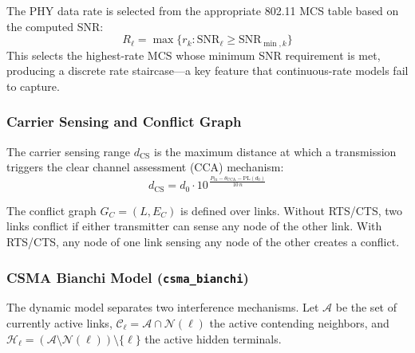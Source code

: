 \documentclass[conference]{IEEEtran}
\begin{document}
The PHY data rate is selected from the appropriate 802.11 MCS table based
on the computed SNR:
\begin{equation}
R_\ell = \max\{r_k : \text{SNR}_\ell \geq \text{SNR}_{\min,k}\}
\label{eq:mcs}
\end{equation}
This selects the highest-rate MCS whose minimum SNR requirement is met,
producing a discrete rate staircase---a key feature that continuous-rate
models fail to capture.

\subsubsection{Carrier Sensing and Conflict Graph}

The carrier sensing range $d_\text{CS}$ is the maximum distance at which a
transmission triggers the clear channel assessment (CCA) mechanism:
\begin{equation}
d_\text{CS} = d_0 \cdot 10^{\,\frac{P_\text{tx} - \theta_\text{CCA} - \text{PL}(d_0)}{10\,n}}
\label{eq:csrange}
\end{equation}

The conflict graph $G_C = (L, E_C)$ is defined over links.  Without RTS/CTS,
two links conflict if either transmitter can sense any node of the other
link.  With RTS/CTS, any node of one link sensing any node of the other
creates a conflict.

\subsubsection{CSMA Bianchi Model (\texttt{csma\_bianchi})}
\label{sec:bianchi}

The dynamic model separates two interference mechanisms.  Let $\mathcal{A}$
be the set of currently active links, $\mathcal{C}_\ell = \mathcal{A} \cap
\mathcal{N}(\ell)$ the active contending neighbors, and $\mathcal{H}_\ell =
(\mathcal{A} \setminus \mathcal{N}(\ell)) \setminus \{\ell\}$ the active
hidden terminals.
\end{document}
